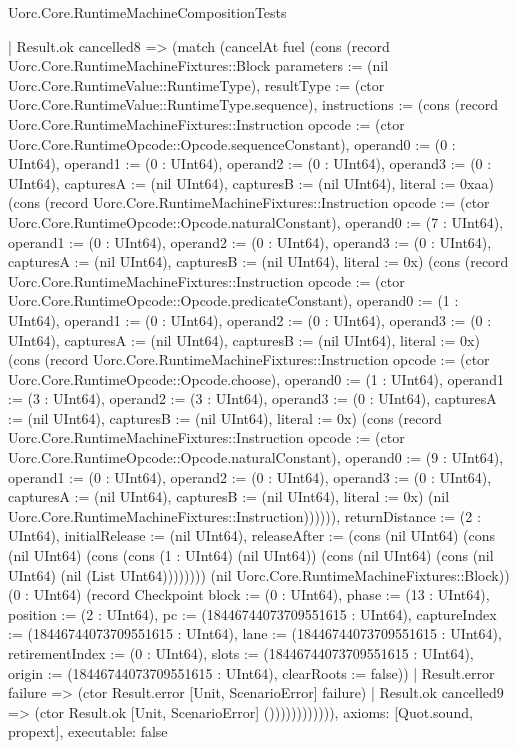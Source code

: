 \begin{lexlean}{Uorc.Core.RuntimeMachineCompositionTests}
\begin{semanticmodule}
{                    | Result.ok cancelled8 => (match (cancelAt fuel (cons (record Uorc.Core.RuntimeMachineFixtures::Block {parameters := (nil Uorc.Core.RuntimeValue::RuntimeType), resultType := (ctor Uorc.Core.RuntimeValue::RuntimeType.sequence), instructions := (cons (record Uorc.Core.RuntimeMachineFixtures::Instruction {opcode := (ctor Uorc.Core.RuntimeOpcode::Opcode.sequenceConstant), operand0 := (0 : UInt64), operand1 := (0 : UInt64), operand2 := (0 : UInt64), operand3 := (0 : UInt64), capturesA := (nil UInt64), capturesB := (nil UInt64), literal := 0xaa}) (cons (record Uorc.Core.RuntimeMachineFixtures::Instruction {opcode := (ctor Uorc.Core.RuntimeOpcode::Opcode.naturalConstant), operand0 := (7 : UInt64), operand1 := (0 : UInt64), operand2 := (0 : UInt64), operand3 := (0 : UInt64), capturesA := (nil UInt64), capturesB := (nil UInt64), literal := 0x}) (cons (record Uorc.Core.RuntimeMachineFixtures::Instruction {opcode := (ctor Uorc.Core.RuntimeOpcode::Opcode.predicateConstant), operand0 := (1 : UInt64), operand1 := (0 : UInt64), operand2 := (0 : UInt64), operand3 := (0 : UInt64), capturesA := (nil UInt64), capturesB := (nil UInt64), literal := 0x}) (cons (record Uorc.Core.RuntimeMachineFixtures::Instruction {opcode := (ctor Uorc.Core.RuntimeOpcode::Opcode.choose), operand0 := (1 : UInt64), operand1 := (3 : UInt64), operand2 := (3 : UInt64), operand3 := (0 : UInt64), capturesA := (nil UInt64), capturesB := (nil UInt64), literal := 0x}) (cons (record Uorc.Core.RuntimeMachineFixtures::Instruction {opcode := (ctor Uorc.Core.RuntimeOpcode::Opcode.naturalConstant), operand0 := (9 : UInt64), operand1 := (0 : UInt64), operand2 := (0 : UInt64), operand3 := (0 : UInt64), capturesA := (nil UInt64), capturesB := (nil UInt64), literal := 0x}) (nil Uorc.Core.RuntimeMachineFixtures::Instruction)))))), returnDistance := (2 : UInt64), initialRelease := (nil UInt64), releaseAfter := (cons (nil UInt64) (cons (nil UInt64) (cons (cons (1 : UInt64) (nil UInt64)) (cons (nil UInt64) (cons (nil UInt64) (nil (List UInt64)))))))}) (nil Uorc.Core.RuntimeMachineFixtures::Block)) (0 : UInt64) (record Checkpoint {block := (0 : UInt64), phase := (13 : UInt64), position := (2 : UInt64), pc := (18446744073709551615 : UInt64), captureIndex := (18446744073709551615 : UInt64), lane := (18446744073709551615 : UInt64), retirementIndex := (0 : UInt64), slots := (18446744073709551615 : UInt64), origin := (18446744073709551615 : UInt64), clearRoots := false}))
                      | Result.error failure => (ctor Result.error [Unit, ScenarioError] failure)
                      | Result.ok cancelled9 => (ctor Result.ok [Unit, ScenarioError] ()))))))))))),
  axioms: [Quot.sound, propext],
  executable: false
}


\end{semanticmodule}
\end{lexlean}
